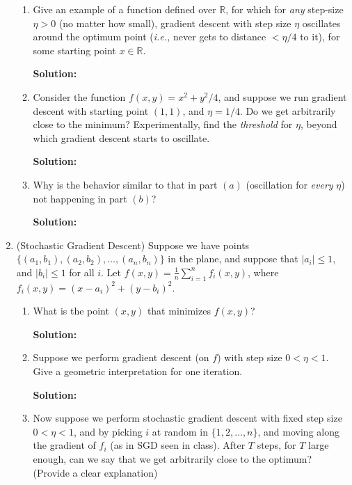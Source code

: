 \documentclass[12pt]{article}
\newcommand{\abs}[1]{\left| #1 \right|}
\newcommand{\R}{\mathbb{R}}
\begin{document}
\begin{enumerate}
\begin{enumerate}
  \item Give an example of a function defined over $\R$, for which for {\em any} step-size $\eta > 0$ (no matter how small), gradient descent with step size $\eta$ oscillates around the optimum point ({\em i.e.,} never gets to distance $< \eta / 4$ to it), for some starting point $x \in \R$.

      {\bf Solution:}

\item Consider the function $f(x,y) = x^{2} + y^{2}/4$, and suppose we run gradient descent with starting point $(1,1)$, and $\eta = 1/4$. Do we get arbitrarily close to the minimum? Experimentally, find the {\em threshold} for $\eta$, beyond which gradient descent starts to oscillate.

      {\bf Solution:}

\item Why is the behavior similar to that in part $(a)$ (oscillation for {\em every} $\eta$) not happening in part $(b)$?

      {\bf Solution:}

\end{enumerate}

\item (Stochastic Gradient Descent) Suppose we have points $\{ (a_{1}, b_{1}), (a_{2}, b_{2}), \ldots, (a_{n}, b_{n})\}$ in the plane, and suppose that $\abs{a_{i}} \leq 1$, and $\abs{b_{i}} \leq 1$ for all $i$. Let $f(x,y) = \frac{1}{n}\sum_{i=1}^{n}f_{i}(x,y)$, where $f_{i}(x,y) = (x - a_{i})^{2} + (y - b_{i})^{2}$.

\begin{enumerate}
  \item What is the point $(x,y)$ that minimizes $f(x,y)$?

      {\bf Solution:}
   
  \item Suppose we perform gradient descent (on $f$) with step size $0 < \eta < 1$. Give a geometric interpretation for one iteration.

      {\bf Solution:}

\item Now suppose we perform stochastic gradient descent with fixed step size $0 < \eta < 1$, and by picking $i$ at random in $\{ 1, 2, \ldots, n\}$, and moving along the gradient of $f_{i}$ (as in SGD seen in class). After $T$ steps, for $T$ large enough, can we say that we get arbitrarily close to the optimum? (Provide a clear explanation)


\end{enumerate}
\end{enumerate}
\end{document}
